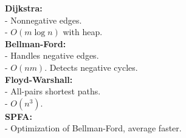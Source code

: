 \textbf{Dijkstra:} \\[1mm]
- Nonnegative edges. \\
- $O(m\log n)$ with heap. \\

\textbf{Bellman-Ford:} \\[1mm]
- Handles negative edges. \\
- $O(nm)$. Detects negative cycles. \\

\textbf{Floyd-Warshall:} \\[1mm]
- All-pairs shortest paths. \\
- $O(n^3)$. \\

\textbf{SPFA:} \\[1mm]
- Optimization of Bellman-Ford, average faster. \\
